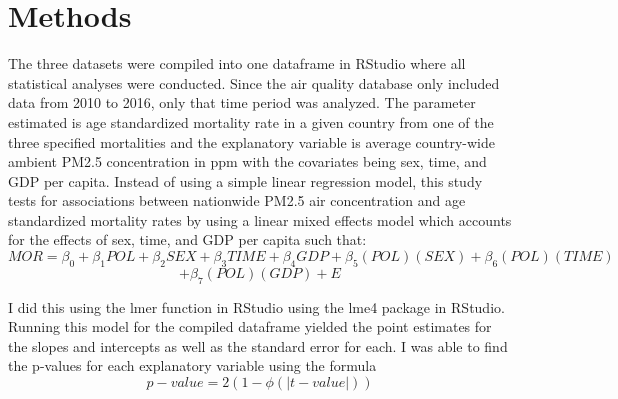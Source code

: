 \documentclass[12pt, letterpaper, twoside]{article}\usepackage[]{graphicx}\usepackage[]{xcolor}
\begin{document}
\section*{Methods}
The three datasets were compiled into one dataframe in RStudio where all
statistical analyses were conducted. Since the air quality database only included
data from 2010 to 2016, only that time period was analyzed. The parameter estimated
is age standardized mortality rate in a given country from one of the three
specified mortalities and the explanatory variable is average country-wide
ambient PM2.5 concentration in ppm with the covariates being sex, time, and GDP
per capita. Instead of using a simple linear regression model, this study tests
for associations between nationwide PM2.5 air concentration and age standardized
mortality rates by using a linear mixed effects model which accounts for the
effects of sex, time, and GDP per capita such that:
\[
  MOR = \beta_{0} + \beta_{1}POL + \beta_{2}SEX + \beta_{3}TIME +\beta_{4}GDP
  + \beta_{5}(POL)(SEX) + \beta_{6}(POL)(TIME)
\]
\[
 + \beta_{7}(POL)(GDP) + E
\]

I did this using the lmer function in RStudio using the lme4 package in RStudio.
Running this model for the compiled dataframe yielded the point estimates for
the slopes and intercepts as well as the standard error for each. I was able to
find the p-values for each explanatory variable using the formula
\[
  p-value = 2(1 - \phi(|t-value|))
\]
\end{document}
